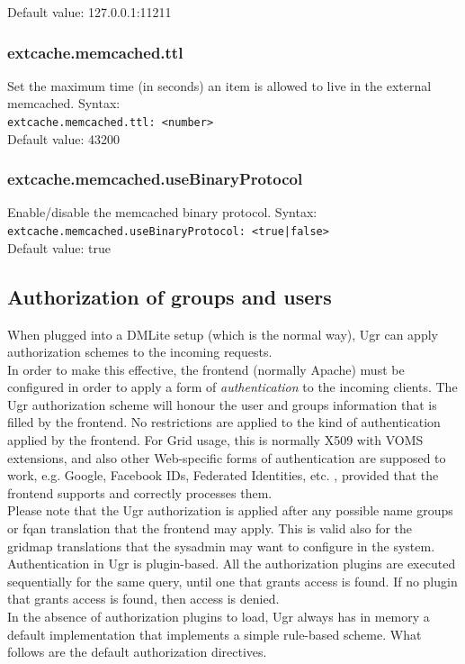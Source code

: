 \documentclass[12pt]{article} %
\begin{document}
Default value: 127.0.0.1:11211

\subsubsection{extcache.memcached.ttl}
Set the maximum time (in seconds) an item is allowed to live in the external memcached.
Syntax:\\
\lstinline"extcache.memcached.ttl: <number>"\\
Default value: 43200\\

\subsubsection{extcache.memcached.useBinaryProtocol}
Enable/disable the memcached binary protocol.
Syntax:\\
\lstinline"extcache.memcached.useBinaryProtocol: <true|false>"\\
Default value: true\\






\subsection{Authorization of groups and users}

When plugged into a DMLite setup (which is the normal way), Ugr can apply authorization schemes to the incoming requests.\\
In order to make this effective, the frontend (normally Apache) must be configured in order to apply a form of \textit{authentication} to the incoming clients. The Ugr authorization scheme will
honour the user and groups information that is filled by the frontend. No restrictions are applied to the kind of authentication applied by the frontend. For Grid usage, this is normally X509 with
VOMS extensions, and also other Web-specific forms of authentication are supposed to work, e.g. Google, Facebook IDs, Federated Identities, etc. , provided that the frontend supports and correctly processes them.\\
Please note that the Ugr authorization is applied after any possible name groups or fqan translation that the frontend may apply. This is valid also for the gridmap translations that the sysadmin may want to configure in the system.\\
Authentication in Ugr is plugin-based. All the authorization plugins are executed sequentially for the same query, until one that grants access is found. If no plugin that grants access is found, then access is denied.\\
In the absence of authorization plugins to load, Ugr always has in memory a default implementation that implements a simple rule-based scheme. What follows are the default authorization directives.\\
\end{document}
